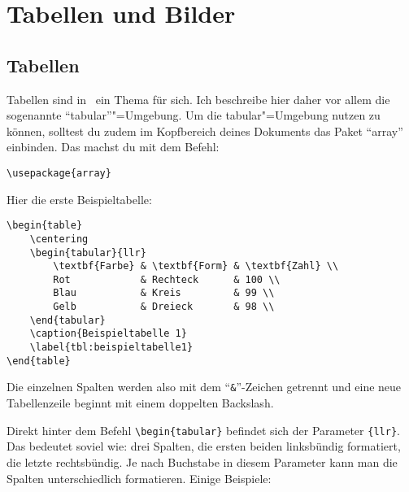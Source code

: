 %
%

\chapter{Tabellen und Bilder}
\label{sec:tabellenundbilder}

\section{Tabellen}

Tabellen sind in \DMLLaTeX \ ein Thema für sich. Ich beschreibe hier daher vor allem die sogenannte \enquote{tabular}"=Umgebung. Um die tabular"=Umgebung nutzen zu können, solltest du zudem im Kopfbereich deines Dokuments das Paket \enquote{array} einbinden. Das machst du mit dem Befehl:

\begin{lstlisting}
\usepackage{array}
\end{lstlisting}

Hier die erste Beispieltabelle:

\begin{lstlisting}
\begin{table}
	\centering
	\begin{tabular}{llr}
		\textbf{Farbe} & \textbf{Form} & \textbf{Zahl} \\
		Rot            & Rechteck      & 100 \\
		Blau           & Kreis         & 99 \\
		Gelb           & Dreieck       & 98 \\
	\end{tabular}
	\caption{Beispieltabelle 1}
	\label{tbl:beispieltabelle1}
\end{table}
\end{lstlisting}

Die einzelnen Spalten werden also mit dem \enquote{\texttt{\&}}-Zeichen getrennt und eine neue Tabellenzeile beginnt mit einem doppelten Backslash.

Direkt hinter dem Befehl \texttt{\textbackslash begin\{tabular\}} befindet sich der Parameter \texttt{\{llr\}}. Das bedeutet soviel wie: drei Spalten, die ersten beiden linksbündig formatiert, die letzte rechtsbündig. Je nach Buchstabe in diesem Parameter kann man die Spalten unterschiedlich formatieren. Einige Beispiele:

